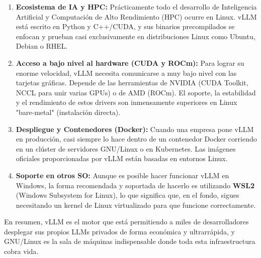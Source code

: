 \documentclass[12pt,a4paper]{article}
\begin{document}
\begin{enumerate}
    \item \textbf{Ecosistema de IA y HPC:} Prácticamente todo el desarrollo de Inteligencia Artificial y Computación de Alto Rendimiento (HPC) ocurre en Linux. vLLM está escrito en Python y C++/CUDA, y sus binarios precompilados se enfocan y prueban casi exclusivamente en distribuciones Linux como Ubuntu, Debian o RHEL.
    
    \item \textbf{Acceso a bajo nivel al hardware (CUDA y ROCm):} Para lograr su enorme velocidad, vLLM necesita comunicarse a muy bajo nivel con las tarjetas gráficas. Depende de las herramientas de NVIDIA (CUDA Toolkit, NCCL para unir varias GPUs) o de AMD (ROCm). El soporte, la estabilidad y el rendimiento de estos drivers son inmensamente superiores en Linux "bare-metal" (instalación directa).
    
    \item \textbf{Despliegue y Contenedores (Docker):} Cuando una empresa pone vLLM en producción, casi siempre lo hace dentro de un contenedor Docker corriendo en un clúster de servidores GNU/Linux o en Kubernetes. Las imágenes oficiales proporcionadas por vLLM están basadas en entornos Linux.
    
    \item \textbf{Soporte en otros SO:} Aunque es posible hacer funcionar vLLM en Windows, la forma recomendada y soportada de hacerlo es utilizando \textbf{WSL2} (Windows Subsystem for Linux), lo que significa que, en el fondo, sigues necesitando un kernel de Linux virtualizado para que funcione correctamente. 
\end{enumerate}

En resumen, vLLM es el motor que está permitiendo a miles de desarrolladores desplegar sus propios LLMs privados de forma económica y ultrarrápida, y GNU/Linux es la sala de máquinas indispensable donde toda esta infraestructura cobra vida.
\end{document}
